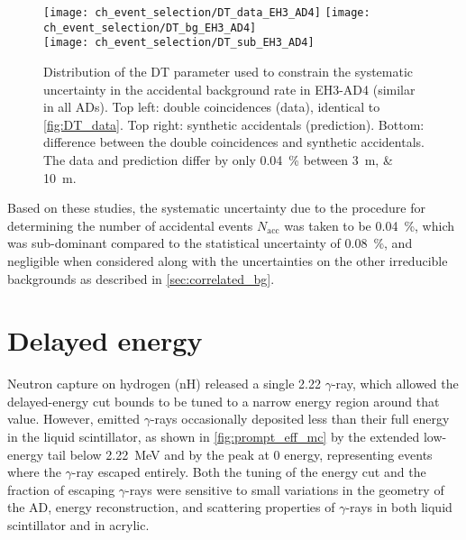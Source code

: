 \begin{figure}
    \centering
    \texttt{[image: ch\_event\_selection/DT\_data\_EH3\_AD4]}
    \texttt{[image: ch\_event\_selection/DT\_bg\_EH3\_AD4]} \\
    \texttt{[image: ch\_event\_selection/DT\_sub\_EH3\_AD4]}
    \caption[Validation of accidentals rate]{
        Distribution of the DT parameter used to constrain
        the systematic uncertainty in the accidental background rate in EH3-AD4
        (similar in all ADs).
        Top left: double coincidences (data), identical to \cref{fig:DT_data}.
        Top right: synthetic accidentals (prediction).
        Bottom: difference between the double coincidences and synthetic accidentals.
        The data and prediction differ by only \SI{0.04}{\percent}
        between \SIlist{3;10}{\m}.
    }
    \label{fig:DT_sub}
\end{figure}

Based on these studies, the systematic uncertainty
due to the procedure for determining the number of accidental events $N_{\text{acc}}$
was taken to be \SI{0.04}{\percent},
which was sub-dominant compared to the statistical uncertainty of \SI{0.08}{\percent},
and negligible when considered along with
the uncertainties on the other irreducible backgrounds
as described in \cref{sec:correlated_bg}.

\section{Delayed energy}
\label{subsec:delayed}

Neutron capture on hydrogen (nH) released a single
\SI{2.22}{\mev} $\gamma$-ray,
which allowed the delayed-energy cut bounds to be tuned to a narrow energy region
around that value.
However, emitted $\gamma$-rays occasionally
deposited less than their full energy in the liquid scintillator,
as shown in \cref{fig:prompt_eff_mc} by the extended low-energy tail
below \SI{2.22}{\MeV} and by the peak at 0 energy,
representing events where the $\gamma$-ray escaped entirely.
Both the tuning of the energy cut
and the fraction of escaping $\gamma$-rays were sensitive to
small variations in the geometry of the AD, energy reconstruction,
and scattering properties of $\gamma$-rays in
both liquid scintillator and in acrylic.

